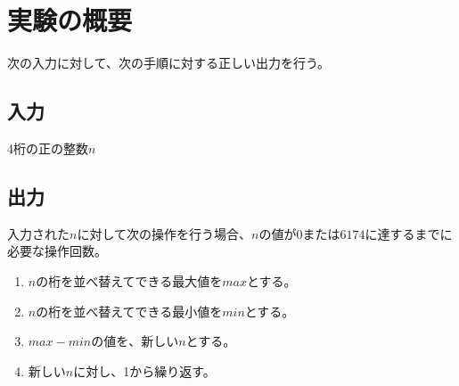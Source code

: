

\section{実験の概要}
  次の入力に対して、次の手順に対する正しい出力を行う。
  \subsection{入力}
    4桁の正の整数$n$
  \subsection{出力}
    入力された$n$に対して次の操作を行う場合、$n$の値が$0$または$6174$に達するまでに必要な操作回数。
    \begin{enumerate}
      \item $n$の桁を並べ替えてできる最大値を$max$とする。
      \item $n$の桁を並べ替えてできる最小値を$min$とする。
      \item $max - min$の値を、新しい$n$とする。
      \item 新しい$n$に対し、1から繰り返す。
    \end{enumerate}


